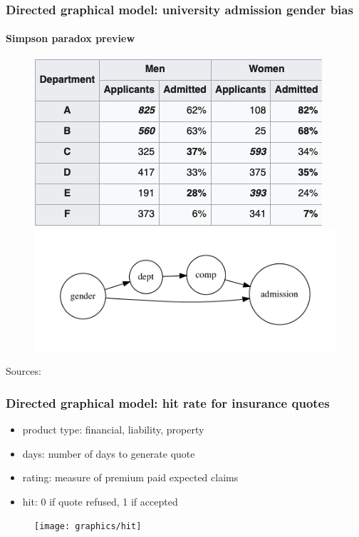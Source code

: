 \begin{frame}
  \frametitle{Directed graphical model: university admission gender bias}
  \framesubtitle{Simpson paradox preview}

  \begin{figure}[ht]
    \centering
            \includegraphics[height=0.35\textheight]{graphics/berkeley_later} 
            \includegraphics[height=0.35\textheight]{graphics/admission_later}
    \end{figure}
    Sources: \cite{simpson-wikipedia} \cite{Bickel398}
\end{frame}


\begin{frame}
\frametitle{Directed graphical model: hit rate for insurance quotes}
\begin{itemize}
  \item product type: financial, liability, property
  \item days: number of days to generate quote
  \item rating: measure of premium paid expected claims
  \item hit: 0 if quote refused, 1 if accepted
\end{itemize}
\begin{figure}[ht]
  \centering
  \texttt{[image: graphics/hit]}
\end{figure}
\end{frame}



